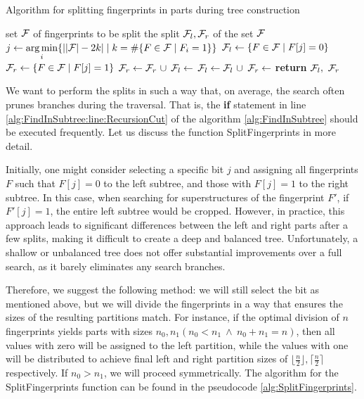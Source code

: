 \begin{algorithm}
  \caption{Algorithm for splitting fingerprints in parts during tree construction} \label{alg:SplitFingerprints}
  \begin{algorithmic}[1]
    \Require set $\mathcal{F}$ of fingerprints to be split
    \Ensure the split $\mathcal{F}_l, \mathcal{F}_r$ of the set $\mathcal{F}$
      \State $j \gets \operatorname*{arg\,min}\limits_{i}\{ \left| |\mathcal{F}| - 2k \right| \mid k = \# \{F \in \mathcal{F} \mid F_i = 1 \} \}$ %
      \State $\mathcal{F}_l \gets \{F \in \mathcal{F} \mid F[j] = 0\}$
      \State $\mathcal{F}_r \gets \{F \in \mathcal{F} \mid F[j] = 1\}$ 
	\State $\F_r \gets \F_r \ \cup$ 
	\State $\mathcal{F}_l \gets $  
	\State $\mathcal{F}_l \gets \mathcal{F}_l \ \cup$ 
	\State $\mathcal{F}_r \gets $  
      \EndIf
      \State \textbf{return} $\mathcal{F}_l, \ \mathcal{F}_r$ 
    \EndProcedure
  \end{algorithmic}
\end{algorithm}

We want to perform the splits in such a way that, on average, the search often prunes branches during the traversal. 
That is, the {\bf if} statement in line \ref{alg:FindInSubtree:line:RecursionCut} of the algorithm \ref{alg:FindInSubtree} 
should be executed frequently. Let us discuss the function SplitFingerprints in more detail.

Initially, one might consider selecting a specific bit $j$ and assigning all fingerprints $F$ such that $F[j] = 0$ to 
the left subtree, and those with $F[j] = 1$ to the right subtree. In this case, when searching for superstructures of 
the fingerprint $F'$, if $F'[j] = 1$, the entire left subtree would be cropped. However, in practice, this approach leads 
to significant differences between the left and right parts after a few splits, making it difficult to create a deep and 
balanced tree. Unfortunately, a shallow or unbalanced tree does not offer substantial improvements over a full search, 
as it barely eliminates any search branches.

Therefore, we suggest the following method: we will still select the bit as mentioned above, but we will divide the 
fingerprints in a way that ensures the sizes of the resulting partitions match. For instance, if the optimal division 
of $n$ fingerprints yields parts with sizes $n_0, n_1 (n_0 < n_1 \ \land \ n_0 + n_1 = n)$, then all values with zero 
will be assigned to the left partition, while the values with one will be distributed to achieve final left and right 
partition sizes of $\lfloor\frac{n}{2}\rfloor, \lceil \frac{n}{2} \rceil$ respectively. If $n_0 > n_1$, we will proceed 
symmetrically. The algorithm for the SplitFingerprints function can be found in the pseudocode \ref{alg:SplitFingerprints}.
